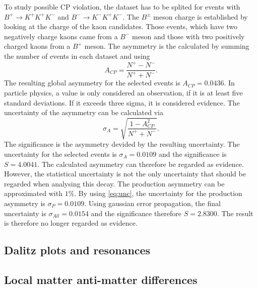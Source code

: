 To study possible CP violation, the dataset has to be splited for events with $B^+ \rightarrow K^+ K^+ K^-$ and $B^- \rightarrow K^- K^+ K^-$. The $B^{\pm}$ meson charge is established by 
looking at the charge of the kaon candidates. Those events, which have two negatively charge kaons came from a $B^-$ meson and those with two positively charged kaons from a $B^+$ meson.
The asymmetry is the calculated by summing the number of events in each dataset and using
\begin{equation}
  A_{CP} = \frac{N^+ - N^-}{N^+ + N^-}.
\end{equation}
The resulting global asymmetry for the selected events is $A_{CP} = 0.0436$. In particle physics, a value is only considered an observation, if it is at least five standard deviations. If it exceeds
three sigma, it is considered evidence. The uncertainty of the asymmetry can be calculated via
\begin{equation}
  \label{eq:unc}
  \sigma_A = \sqrt{\frac{1-A_{CP}^2}{N^+ + N^-}}.
\end{equation}
The significance is the asymmetry devided by the resulting uncertainty. The uncertainty for the selected events is $\sigma_A = 0.0109$ and the significance is $S = 4.0041$. The calculated asymmetry can therefore be regarded 
as evidence.\\
However, the statistical uncertainty is not the only uncertainty that should be regarded when analysing this decay. The production asymmetry can be approximated with $1\%$. By using \autoref{eq:unc}, the uncertainty
for the production asymmetry is $\sigma_P = 0.0109$. Using gaussian error propagation, the final uncertainty is $\sigma_{All} = 0.0154$ and the significance therefore $S = 2.8300$. The result is therefore
no longer regarded as evidence.

\subsection{Dalitz plots and resonances}

\subsection{Local matter anti-matter differences}